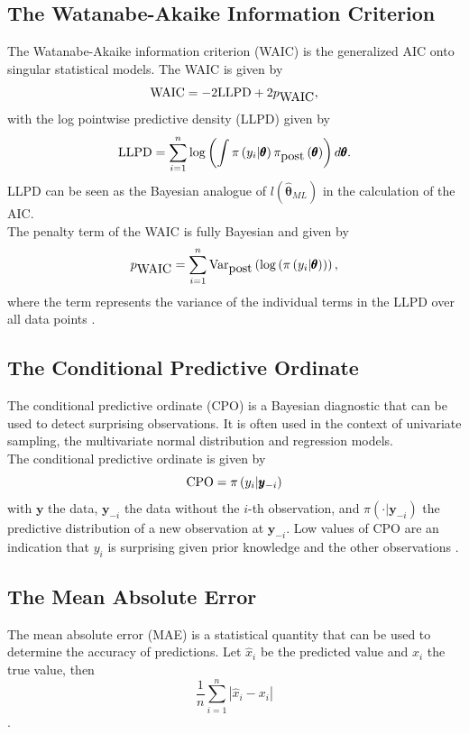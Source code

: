 \subsection{The Watanabe-Akaike Information Criterion}
The Watanabe-Akaike information criterion (WAIC) is the generalized AIC onto singular statistical models.
The WAIC is given by
\begin{equation}
    \hbox{WAIC} = -2\hbox{LLPD}+2p_{\hbox{WAIC}},
\end{equation}
with the log pointwise predictive density (LLPD) given by
\begin{equation}
    \hbox{LLPD} = \sum_{i=1}^n\log\left(\int \pi\left(y_i|\pmb{\theta}\right)\pi_{\hbox{post}}\left(\pmb{\theta}\right)\right)d\pmb{\theta}.
\end{equation}
LLPD can be seen as the Bayesian analogue of $l\left(\widehat{\pmb{\theta}}_{ML}\right)$ in the calculation of the AIC.\\
The penalty term of the WAIC is fully Bayesian and given by
\begin{equation}
    p_{\hbox{WAIC}}=\sum_{i=1}^n\hbox{Var}_{\hbox{post}}\left(\log\left(\pi\left(y_i|\pmb{\theta}\right)\right)\right),
\end{equation}
where the term represents the variance of the individual terms in the LLPD over all data points \autocite[][]{watanabe2010asymptotic, yong2018loo}. \clearpage
\subsection{The Conditional Predictive Ordinate}
The conditional predictive ordinate (CPO) is a Bayesian diagnostic that can be used to detect surprising observations. It is often used in the context of univariate sampling, the multivariate normal distribution and regression models. \\
The conditional predictive ordinate is given by
\begin{equation}
    \hbox{CPO} = \pi\left(y_i|\pmb{y}_{-i}\right)
\end{equation}
with $\pmb{y}$ the data, $\pmb{y}_{-i}$ the data without the $i$-th observation, and $\pi\left(\cdot|\pmb{y}_{-i}\right)$ the predictive distribution of a new observation at $\pmb{y}_{-i}$. Low values of CPO are an indication that $y_i$ is surprising given prior knowledge and the other observations \autocite[][]{pettit1990conditional, cox1980discussion}.
\subsection{The Mean Absolute Error}
The mean absolute error (MAE) is a statistical quantity that can be used to determine the accuracy of predictions. Let $\widehat{x}_i$ be the predicted value and $x_i$ the true value, then
\begin{equation}
    \frac{1}{n}\sum_{i=1}^n\left|\widehat{x}_i-x_i\right|
\end{equation}
\autocite[][]{willmott2005advantages}.
\clearpage
